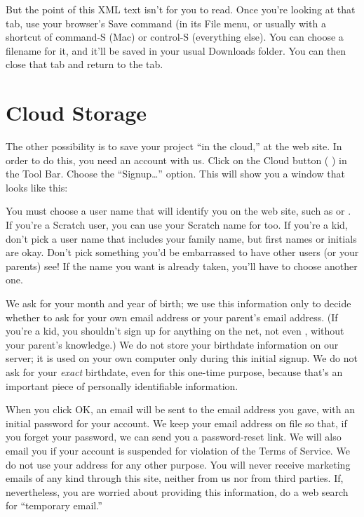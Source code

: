 \documentclass{report}
\begin{document}
But the point of this XML text isn't for you to read. Once you're looking at that tab, use your browser's Save command (in its File menu, or usually with a shortcut of command-S (Mac) or control-S (everything else). You can choose a filename for it, and it'll be saved in your usual Downloads folder. You can then close that tab and return to the \Snap{} tab.

\section{Cloud Storage}

The other possibility is to save your project ``in the cloud,'' at the \Snap{} web site. In order to do this, you need an account with us. Click on the Cloud button (\,\,) in the Tool Bar. Choose the ``Signup\ldots'' option. This will show you a window that looks like this:\nopagebreak


You must choose a user name that will identify you on the web site, such as  or . If you're a Scratch user, you can use your Scratch name for \Snap{} too. If you're a kid, don't pick a user name that includes your family name, but first names or initials are okay. Don't pick something you'd be embarrassed to have other users (or your parents) see! If the name you want is already taken, you'll have to choose another one.

We ask for your month and year of birth; we use this information only to decide whether to ask for your own email address or your parent's email address. (If you're a kid, you shouldn't sign up for anything on the net, not even \Snap{}, without your parent's knowledge.) We do not store your birthdate information on our server; it is used on your own computer only during this initial signup. We do not ask for your \emph{exact} birthdate, even for this one-time purpose, because that's an important piece of personally identifiable information.

When you click OK, an email will be sent to the email address you gave, with an initial password for your account. We keep your email address on file so that, if you forget your password, we can send you a password-reset link. We will also email you if your account is suspended for violation of the Terms of Service. We do not use your address for any other purpose. You will never receive marketing emails of any kind through this site, neither from us nor from third parties. If, nevertheless, you are worried about providing this information, do a web search for ``temporary email.''
\end{document}
